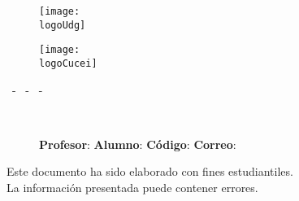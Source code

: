



\begin{titlepage}
	\centering
	{\LARGE \textbf{\universidad}}\par
	\vspace{0.6cm}
	{\Large{\cede}}
	\vfill

	\begin{figure}[ht]
		\begin{minipage}[t]{0.45\textwidth}
			\centering
			\texttt{[image: \\logoUdg]}
		\end{minipage}
		\hfill
		\begin{minipage}[t]{0.45\textwidth}
			\centering
			\texttt{[image: \\logoCucei]}
		\end{minipage}
	\end{figure}
	\vfill

	\large{
		\division\vfill
		\textbf{\carrera}\vfill
		\textbf{\materia}\par\vspace{3pt}
		\seccion\ - \clave\ - \nrc\ - \generation \vfill
	}

	{\Large{\textbf{\theTitle \\}}}
	\vfill

	\begin{figure}[ht]
		\centering
		\begin{minipage}[t]{0.35\textwidth}
			{\large
				\textbf{Profesor}: \profesor\nl
				\textbf{Alumno}: \theAuthor\nl
				\textbf{Código}: \theAuthorCode\nl
				\textbf{Correo}: \theAuthorMail
			}
		\end{minipage}
	\end{figure}
	\vfill

	\begin{tcolorbox}
		[colback=red!5!white, colframe=red!75!black]
		\centering
		\large{
			Este documento ha sido elaborado con fines estudiantiles.\\
			La información presentada puede contener errores.
		}
	\end{tcolorbox}
	\vfill
	{\large \startDate}
\end{titlepage}

\restoregeometry %

\clearpage
\tableofcontents

